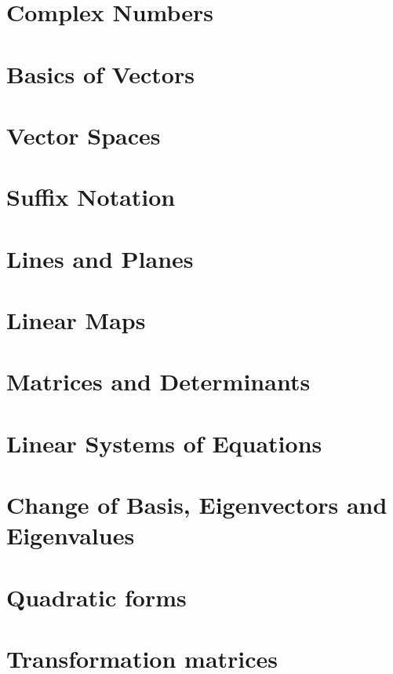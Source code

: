 \documentclass[british,11pt,a4paper]{report}
\begin{document}
\maketitle
\tableofcontents
\chapter{Complex Numbers} %

\chapter{Basics of Vectors} %
\chapter{Vector Spaces} %
\chapter{Suffix Notation} %
\chapter{Lines and Planes} %
\chapter{Linear Maps} %
\chapter{Matrices and Determinants} %
\chapter{Linear Systems of Equations} %
\chapter{Change of Basis, Eigenvectors and Eigenvalues} %

\chapter{Quadratic forms}
\chapter{Transformation matrices}

\end{document}
